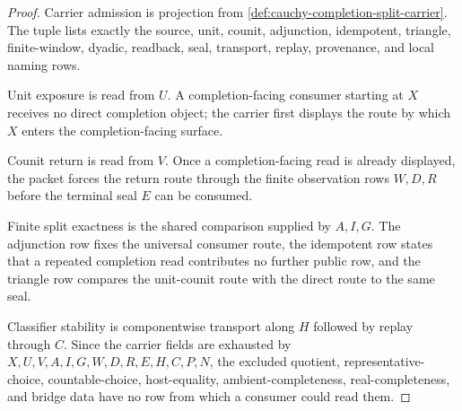 \begin{proof}
Carrier admission is projection from \autoref{def:cauchy-completion-split-carrier}. The tuple lists exactly the source, unit, counit, adjunction, idempotent, triangle, finite-window, dyadic, readback, seal, transport, replay, provenance, and local naming rows.

Unit exposure is read from $U$. A completion-facing consumer starting at $X$ receives no direct completion object; the carrier first displays the route by which $X$ enters the completion-facing surface.

Counit return is read from $V$. Once a completion-facing read is already displayed, the packet forces the return route through the finite observation rows $W,D,R$ before the terminal seal $E$ can be consumed.

Finite split exactness is the shared comparison supplied by $A,I,G$. The adjunction row fixes the universal consumer route, the idempotent row states that a repeated completion read contributes no further public row, and the triangle row compares the unit-counit route with the direct route to the same seal.

Classifier stability is componentwise transport along $H$ followed by replay through $C$. Since the carrier fields are exhausted by $X,U,V,A,I,G,W,D,R,E,H,C,P,N$, the excluded quotient, representative-choice, countable-choice, host-equality, ambient-completeness, real-completeness, and bridge data have no row from which a consumer could read them.
\end{proof}

